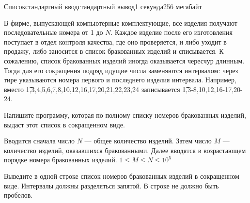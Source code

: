 \begin{problem}{Список}{стандартный ввод}{стандартный вывод}{1 секунда}{256 мегабайт}

В фирме, выпускающей компьютерные комплектующие, все изделия получают последовательные номера от 1 до $N$. Каждое изделие после его изготовления поступает в отдел контроля качества, где оно проверяется, и либо уходит в продажу, либо заносится в список бракованных изделий и списывается. К сожалению, список бракованных изделий иногда оказывается чересчур длинным. Тогда для его сокращения подряд идущие числа заменяются интервалом: через тире указываются номера первого и последнего изделия интервала. Например, вместо \t{1,3,4,5,6,7,8,10,12,16,17,20,21,22,23,24} записывается \t{1,3-8,10,12,16-17,20-24}.

Напишите программу, которая по полному списку номеров бракованных изделий, выдаст этот список в сокращенном виде. 


\InputFile
Вводится сначала число $N$ --- общее количество изделий. Затем число $M$ --- количество изделий, оказавшихся бракованными. Далее вводятся в возрастающем порядке номера бракованных изделий. $1 \le M \le N \le 10^5$


\OutputFile
Выведите в одной строке список номеров бракованных изделий в сокращенном виде. Интервалы должны разделяться запятой. В строке не должно быть пробелов.

\Examples

\begin{example}
%
%
%
%
\end{example}

\end{problem}

